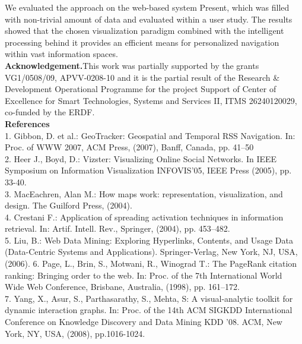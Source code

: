 \documentclass{llncs}
\begin{document}
We evaluated the approach on the web-based system Present, which was filled with non-trivial amount of data and evaluated within a user study. The results showed that the chosen visualization paradigm combined with the intelligent processing behind it provides an efficient means for personalized navigation within vast information spaces.\\
\textbf{Acknowledgement.}This work was partially supported by the grants VG1/0508/09, APVV-0208-10 and it is the partial result of the Research \& Development Operational Programme for the project Support of Center of Excellence for Smart Technologies, Systems and Services II, ITMS 26240120029, co-funded by the ERDF.\\
\textbf{References}\\ 1. Gibbon, D. et al.: GeoTracker: Geospatial and Temporal RSS Navigation. In: Proc. of WWW 2007, ACM Press, (2007), Banff, Canada, pp. 41–50\\
2. Heer J., Boyd, D.: Vizster: Visualizing Online Social Networks. In IEEE Symposium on Information Visualization INFOVIS'05, IEEE Press (2005), pp. 33-40.\\
3. MacEachren, Alan M.: How maps work: representation, visualization, and design. The Guilford Press, (2004). \\
4. Crestani F.: Application of spreading activation techniques in information retrieval. In: Artif. Intell. Rev., Springer, (2004), pp. 453–482. \\
5. Liu, B.: Web Data Mining: Exploring Hyperlinks, Contents, and Usage Data (Data-Centric Systems and Applications). Springer-Verlag, New York, NJ, USA, (2006).
6. Page, L., Brin, S., Motwani, R., Winograd T.: The PageRank citation ranking: Bringing order to the web. In: Proc. of the 7th International World Wide Web Conference, Brisbane, Australia, (1998), pp. 161–172.\\
7. Yang, X., Asur, S., Parthasarathy, S., Mehta, S: A visual-analytic toolkit for dynamic interaction graphs. In: Proc. of the 14th ACM SIGKDD International Conference on Knowledge Discovery and Data Mining KDD '08. ACM, New York, NY, USA, (2008), pp.1016-1024.\\
\end{document}
